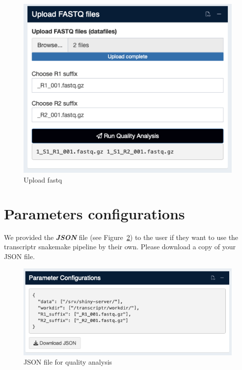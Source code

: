\documentclass[
  a4paper,
  oneside,
  open=any]{scrreport}
\begin{document}
\begin{figure}[H]

{\centering \includegraphics{./images/quality/quality2.png}

}

\caption{\label{fig-qual2}Upload fastq}

\end{figure}

\hypertarget{parameters-configurations}{%
\section{Parameters configurations}\label{parameters-configurations}}

We provided the \textbf{\emph{JSON}} file (see Figure~\ref{fig-qual3})
to the user if they want to use the transcriptr snakemake pipeline by
their own. Please download a copy of your JSON file.

\begin{figure}[H]

{\centering \includegraphics{./images/quality/quality3.png}

}

\caption{\label{fig-qual3}JSON file for quality analysis}

\end{figure}
\end{document}
